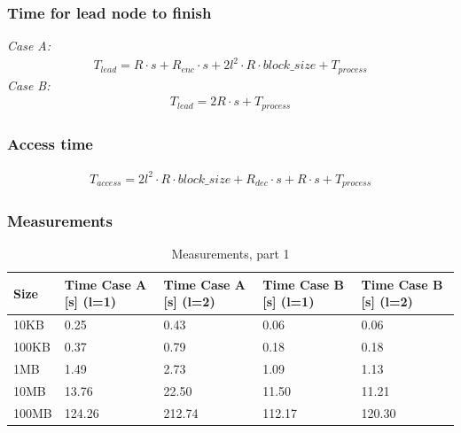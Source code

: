 \subsubsection*{Time for lead node to finish}
\textit{Case A:} 
\begin{align}
    T_{lead} = R \cdot s + R_{enc} \cdot s + 2l^{2} \cdot R \cdot block\_size + T_{process}
\end{align}
\textit{Case B:} 
\begin{align}
    T_{lead} = 2R \cdot s + T_{process}
\end{align}

\subsubsection*{Access time}
\begin{align}
    T_{access} = 2l^{2} \cdot R \cdot block\_size + R_{dec} \cdot s + R \cdot s + T_{process}
\end{align}

\subsubsection*{Measurements}
\begin{table}[H]
    \begin{tabularx}{\textwidth}{|X|X|X|X|X|}
        \hline
        \cellcolor{lightgray}\textbf{Size} & \cellcolor{lightgray}\textbf{Time Case A [s] (l=1)} & \cellcolor{lightgray}\textbf{Time Case A [s] (l=2)} & \cellcolor{lightgray}\textbf{Time Case B [s] (l=1)} & \cellcolor{lightgray}\textbf{Time Case B [s] (l=2)} \\\hline
        10KB  & 0.25   & 0.43   & 0.06   & 0.06   \\\hline
        100KB & 0.37   & 0.79   & 0.18   & 0.18   \\\hline
        1MB   & 1.49   & 2.73   & 1.09   & 1.13   \\\hline
        10MB  & 13.76  & 22.50  & 11.50  & 11.21  \\\hline
        100MB & 124.26 & 212.74 & 112.17 & 120.30 \\\hline
    \end{tabularx}
    \caption{Measurements, part 1}
	\label{tab:e3meas1}
\end{table}

